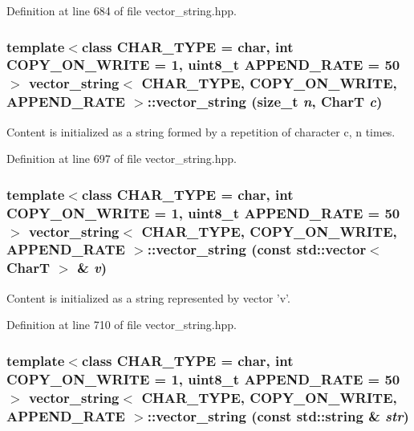 Definition at line 684 of file vector\_\-string.hpp.\hypertarget{classvector__string_4ac410fc06b3114392431da64a20d898}{
\subsubsection[{vector\_\-string}]{\setlength{\rightskip}{0pt plus 5cm}template$<$class CHAR\_\-TYPE  = char, int COPY\_\-ON\_\-WRITE = 1, uint8\_\-t APPEND\_\-RATE = 50$>$ {\bf vector\_\-string}$<$ CHAR\_\-TYPE, COPY\_\-ON\_\-WRITE, APPEND\_\-RATE $>$::{\bf vector\_\-string} (size\_\-t {\em n}, \/  CharT {\em c})}}
\label{classvector__string_4ac410fc06b3114392431da64a20d898}


Content is initialized as a string formed by a repetition of character c, n times. 

Definition at line 697 of file vector\_\-string.hpp.\hypertarget{classvector__string_aa9d66b28113b5bd88d74ea674171650}{
\subsubsection[{vector\_\-string}]{\setlength{\rightskip}{0pt plus 5cm}template$<$class CHAR\_\-TYPE  = char, int COPY\_\-ON\_\-WRITE = 1, uint8\_\-t APPEND\_\-RATE = 50$>$ {\bf vector\_\-string}$<$ CHAR\_\-TYPE, COPY\_\-ON\_\-WRITE, APPEND\_\-RATE $>$::{\bf vector\_\-string} (const std::vector$<$ CharT $>$ \& {\em v})}}
\label{classvector__string_aa9d66b28113b5bd88d74ea674171650}


Content is initialized as a string represented by vector 'v'. 

Definition at line 710 of file vector\_\-string.hpp.\hypertarget{classvector__string_30b427f9cd6bf7bc011355df355f3c1a}{
\subsubsection[{vector\_\-string}]{\setlength{\rightskip}{0pt plus 5cm}template$<$class CHAR\_\-TYPE  = char, int COPY\_\-ON\_\-WRITE = 1, uint8\_\-t APPEND\_\-RATE = 50$>$ {\bf vector\_\-string}$<$ CHAR\_\-TYPE, COPY\_\-ON\_\-WRITE, APPEND\_\-RATE $>$::{\bf vector\_\-string} (const std::string \& {\em str})}}
\label{classvector__string_30b427f9cd6bf7bc011355df355f3c1a}


